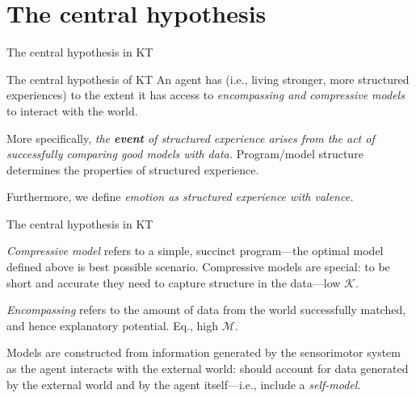 \section{The central hypothesis}

\begin{frame}[label=ladila]{The central hypothesis in KT}

\begin{exampleblock}{The central hypothesis of KT}
An agent has \SEP (i.e., living stronger, more structured experiences) to the extent it has access to {\em encompassing and compressive models}  to interact with the world.  

\vspace{0.5cm}

More specifically,  {\em the \textbf{event}  of structured experience arises from the act of successfully comparing good models with data.}  Program/model structure determines the properties of structured experience. \vspace{0.5cm}

Furthermore, we define {\em emotion as structured experience with valence.}
\end{exampleblock}
 \vfill

 

\end{frame}

\begin{frame}[label=ladila]{The central hypothesis in KT}
 
    {\em Compressive model} refers to a simple, succinct program---the optimal model defined above is best possible scenario. Compressive models are special: to be short and accurate they need to capture structure in the data---low $\mathcal K$.  \vfill
    
        {\em Encompassing} refers to the amount of data from the world  successfully matched, and hence   explanatory potential.  Eq., high $\mathcal M$.   %
        \vfill
    
    Models are constructed from information generated by the sensorimotor system as the agent interacts with the external world: should account for data generated by the external world and by the agent itself---i.e., include a {\em self-model}.
    
 
\end{frame}


